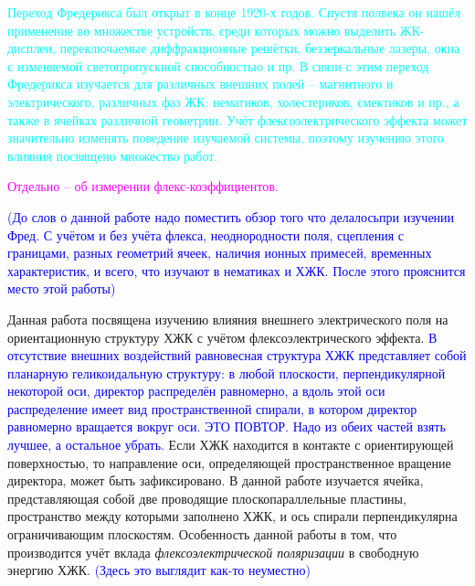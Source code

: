 \textcolor{cyan}{Переход Фредерикса был открыт в конце 1920-х годов.
	Спустя полвека он нашёл применение во множестве устройств, среди которых можно выделить ЖК-дисплеи, переключаемые диффракционные решётки, беззеркальные лазеры, окна с изменяемой светопропускной способностью и пр. 
	В связи с этим переход Фредерикса изучается для различных внешних полей -- магнитного и электрического, различных фаз ЖК: нематиков, холестериков, смектиков и пр., а также в ячейках различной геометрии. 
	Учёт флексоэлектрического эффекта может значительно изменять поведение изучаемой системы, поэтому изучению этого влияния посвящено множество работ.
}

\textcolor{magenta}{Отдельно -- об измерении флекс-коэффициентов.}

\textcolor{blue}{(До слов о данной работе надо поместить обзор того что делалосьпри изучении Фред.  С учётом и без учёта флекса, неоднородности поля, сцепления с границами, разных геометрий ячеек, наличия ионных примесей, временных характеристик, и всего, что изучают в нематиках и ХЖК. После этого прояснится место этой работы)}

Данная работа посвящена изучению влияния внешнего электрического поля на ориентационную структуру ХЖК с учётом флексоэлектрического эффекта.
\textcolor{blue}{В отсутствие внешних воздействий равновесная структура ХЖК представляет собой планарную геликоидальную структуру: в любой плоскости, перпендикулярной некоторой оси, директор распределён равномерно, а вдоль этой оси распределение имеет вид пространственной спирали, в котором директор равномерно вращается вокруг оси. ЭТО ПОВТОР. Надо из обеих частей взять лучшее, а остальное убрать.}
Если ХЖК находится в контакте с ориентирующей поверхностью, то направление оси, определяющей пространственное вращение директора, может быть зафиксировано.
В данной работе изучается ячейка, представляющая собой две проводящие плоскопараллельные пластины, пространство между которыми заполнено ХЖК, и ось спирали перпендикулярна ограничивающим плоскостям.
Особенность данной работы в том, что производится учёт вклада \textit{флексоэлектрической поляризации} в свободную энергию ХЖК. \textcolor{blue}{(Здесь это выглядит как-то неуместно)}


